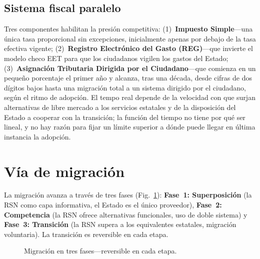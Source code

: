 \documentclass[11pt,a4paper,twocolumn]{article}
\begin{document}
\subsection{Sistema fiscal paralelo}

Tres componentes habilitan la presión competitiva: (1)~\textbf{Impuesto Simple}---una única tasa proporcional sin excepciones, inicialmente apenas por debajo de la tasa efectiva vigente; (2)~\textbf{Registro Electrónico del Gasto (REG)}---que invierte el modelo checo EET para que los ciudadanos vigilen los gastos del Estado; (3)~\textbf{Asignación Tributaria Dirigida por el Ciudadano}---que comienza en un pequeño porcentaje el primer año y alcanza, tras una década, desde cifras de dos dígitos bajos hasta una migración total a un sistema dirigido por el ciudadano, según el ritmo de adopción. El tempo real depende de la velocidad con que surjan alternativas de libre mercado a los servicios estatales y de la disposición del Estado a cooperar con la transición; la función del tiempo no tiene por qué ser lineal, y no hay razón para fijar un límite superior a dónde puede llegar en última instancia la adopción.

\section{Vía de migración}

La migración avanza a través de tres fases (Fig.~\ref{fig:migration}): \textbf{Fase~1: Superposición} (la RSN como capa informativa, el Estado es el único proveedor), \textbf{Fase~2: Competencia} (la RSN ofrece alternativas funcionales, uso de doble sistema) y \textbf{Fase~3: Transición} (la RSN supera a los equivalentes estatales, migración voluntaria). La transición es reversible en cada etapa.

\begin{figure}[ht]
\centering
{}
\caption{Migración en tres fases---reversible en cada etapa.}
\label{fig:migration}
\end{figure}
\end{document}
